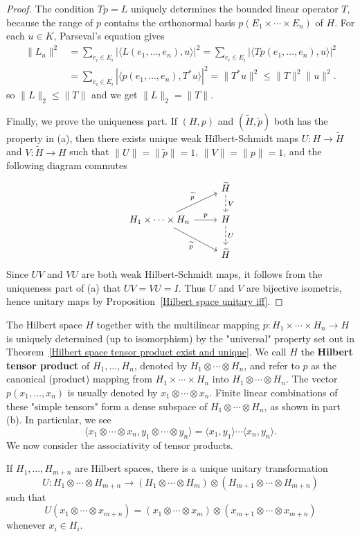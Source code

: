 \begin{proof}
The condition $Tp=L$ uniquely determines the bounded linear operator $T$, because the range of $p$ contains the orthonormal basis $p(E_1\times\cdots\times E_n)$ of $H$. For each $u\in K$, Parseval's equation gives
\begin{align*}
\|L_u\|^2&=\sum_{e_i\in E_i}|\langle L(e_1,\dots,e_n),u\rangle|^2=\sum_{e_i\in E_i}|\langle Tp(e_1,\dots,e_n),u\rangle|^2\\
&=\sum_{e_i\in E_i}|\langle p(e_1,\dots,e_n),T^*u\rangle|^2=\|T^*u\|^2\leq\|T\|^2\|u\|^2.
\end{align*}
so $\|L\|_2\leq\|T\|$ and we get $\|L\|_2=\|T\|$.\par
Finally, we prove the uniqueness part. If $(H,p)$ and $(\widetilde{H},\widetilde{p})$ both has the property in (a), then there exists unique weak Hilbert-Schmidt maps $U:H\to\widetilde{H}$ and $V:\widetilde{H}\to H$ such that $\|U\|=\|\widetilde{p}\|=1$, $\|V\|=\|p\|=1$, and the following diagram commutes
\[\begin{tikzcd}
&\widetilde{H}\ar[d,dashed,"V"]\\
H_1\times\cdots\times H_n\ar[r,"p"]\ar[rd,swap,"\widetilde{p}"]\ar[ru,"\widetilde{p}"]&H\ar[d,dashed,"U"]\\\
&\widetilde{H}
\end{tikzcd}\]
Since $UV$ and $VU$ are both weak Hilbert-Schmidt maps, it follows from the uniqueness part of (a) that $UV=VU=I$. Thus $U$ and $V$ are bijective isometris, hence unitary maps by Proposition~\ref{Hilbert space unitary iff}.
\end{proof}
The Hilbert space $H$ together with the multilinear mapping $p:H_1\times\cdots\times H_n\to H$ is uniquely determined (up to isomorphism) by the "universal" property set out in Theorem~\ref{Hilbert space tensor product exist and unique}. We call $H$ the \textbf{Hilbert tensor product} of $H_1,\dots,H_n$, denoted by $H_1\otimes\cdots\otimes H_n$, and refer to $p$ as the canonical (product) mapping from $H_1\times\cdots\times H_n$ into $H_1\otimes\cdots\otimes H_n$. The vector $p(x_1,\dots,x_n)$ is usually denoted by $x_1\otimes\cdots\otimes x_n$. Finite linear combinations of these "simple tensors" form a dense subspace of $H_1\otimes\cdots\otimes H_n$, as shown in part (b). In particular, we see
\[\langle x_1\otimes\cdots\otimes x_n,y_1\otimes\cdots\otimes y_n\rangle=\langle x_1,y_1\rangle\cdots\langle x_n,y_n\rangle.\]
We now consider the associativity of tensor products.
\begin{proposition}\label{Hilbert space tensor product associativity}
If $H_1,\dots,H_{m+n}$ are Hilbert spaces, there is a unique unitary transformation 
\[U:H_1\otimes\cdots\otimes H_{m+n}\to(H_1\otimes\cdots\otimes H_{m})\otimes(H_{m+1}\otimes\cdots\otimes H_{m+n})\]
such that
\[U(x_1\otimes\cdots\otimes x_{m+n})=(x_1\otimes\cdots\otimes x_{m})\otimes(x_{m+1}\otimes\cdots\otimes x_{m+n})\]
whenever $x_i\in H_i$.
\end{proposition}
